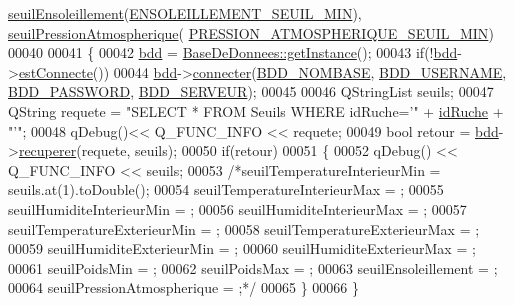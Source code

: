 \begin{DoxyCode}
      \hyperlink{class_alertes_a7f512b6d3b5bc0851757ab4d18279ccf}{seuilEnsoleillement}(\hyperlink{parametres_8h_a1174d9c2d3ff7e8a5e464d7e0a20e1a9}{ENSOLEILLEMENT\_SEUIL\_MIN}), 
      \hyperlink{class_alertes_a565094789ef5eb0ae2a2a562ee8a9704}{seuilPressionAtmospherique}(
      \hyperlink{parametres_8h_a70a55fd4037201bf606fc9e9d54e61cb}{PRESSION\_ATMOSPHERIQUE\_SEUIL\_MIN})
00040 
00041 \{
00042     \hyperlink{class_alertes_a91e58b69d29922e8e984efb767ae5268}{bdd} = \hyperlink{class_base_de_donnees_a80028aa2b6b4fbf30fb2e36357b7d3d3}{BaseDeDonnees::getInstance}();
00043     \textcolor{keywordflow}{if}(!\hyperlink{class_alertes_a91e58b69d29922e8e984efb767ae5268}{bdd}->\hyperlink{class_base_de_donnees_a00388973f3ec42e5c8e76e7af7e124b2}{estConnecte}())
00044         \hyperlink{class_alertes_a91e58b69d29922e8e984efb767ae5268}{bdd}->\hyperlink{class_base_de_donnees_ac20da193923a9bfea5e38ee5a54820cd}{connecter}(\hyperlink{parametres_8h_a45f8f15b8f9a7ab4c2b219038ff64f6b}{BDD\_NOMBASE}, \hyperlink{parametres_8h_a88b5f5b81fa534553c68802384beff2c}{BDD\_USERNAME}, 
      \hyperlink{parametres_8h_ae2ded9166ed2553182545e97514c04f7}{BDD\_PASSWORD}, \hyperlink{parametres_8h_a423559dc987673b8aacaa9f369839bb0}{BDD\_SERVEUR});
00045 
00046     QStringList seuils;
00047     QString requete = \textcolor{stringliteral}{"SELECT * FROM Seuils WHERE idRuche='"} + \hyperlink{class_alertes_ae3f9d7aa34ab3c83a66c8484e2b89925}{idRuche} + \textcolor{stringliteral}{"'"};
00048     qDebug()<< Q\_FUNC\_INFO << requete;
00049     \textcolor{keywordtype}{bool} retour = \hyperlink{class_alertes_a91e58b69d29922e8e984efb767ae5268}{bdd}->\hyperlink{class_base_de_donnees_a77539baad389f5acf754cd2cd452403e}{recuperer}(requete, seuils);
00050     \textcolor{keywordflow}{if}(retour)
00051     \{
00052         qDebug() << Q\_FUNC\_INFO << seuils;
00053         \textcolor{comment}{/*seuilTemperatureInterieurMin = seuils.at(1).toDouble();}
00054 \textcolor{comment}{        seuilTemperatureInterieurMax = ;}
00055 \textcolor{comment}{        seuilHumiditeInterieurMin = ;}
00056 \textcolor{comment}{        seuilHumiditeInterieurMax = ;}
00057 \textcolor{comment}{        seuilTemperatureExterieurMin = ;}
00058 \textcolor{comment}{        seuilTemperatureExterieurMax = ;}
00059 \textcolor{comment}{        seuilHumiditeExterieurMin = ;}
00060 \textcolor{comment}{        seuilHumiditeExterieurMax = ;}
00061 \textcolor{comment}{        seuilPoidsMin = ;}
00062 \textcolor{comment}{        seuilPoidsMax = ;}
00063 \textcolor{comment}{        seuilEnsoleillement = ;}
00064 \textcolor{comment}{        seuilPressionAtmospherique = ;*/}
00065     \}
00066 \}
\end{DoxyCode}
\mbox{\label{class_alertes_a730b10861d04de9944b30b11c6b3c3af}} 
